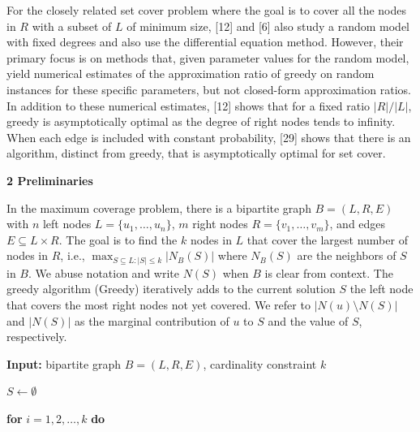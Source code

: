 For the closely related set cover problem where the goal is to cover all the nodes in $R$ with a subset of $L$ of minimum size, [12] and [6] also study a random model with fixed degrees and also use the differential equation method. However, their primary focus is on methods that, given parameter values for the random model, yield numerical estimates of the approximation ratio of greedy on random instances for these specific parameters, but not closed-form approximation ratios. In addition to these numerical estimates, [12] shows that for a fixed ratio $|R|/|L|$, greedy is asymptotically optimal as the degree of right nodes tends to infinity. When each edge is included with constant probability, [29] shows that there is an algorithm, distinct from greedy, that is asymptotically optimal for set cover.\par






\par\medskip\noindent\textbf{2 Preliminaries}\par




In the maximum coverage problem, there is a bipartite graph $B=(L,R,E)$ with $n$ left nodes $L=\{u_{1},\ldots,u_{n}\}$, $m$ right nodes $R=\{v_{1},\ldots,v_{m}\}$, and edges $E\subseteq L\times R$. The goal is to find the $k$ nodes in $L$ that cover the largest number of nodes in $R$, i.e., $\max_{S\subseteq L:|S|\leq k}|N_{B}(S)|$ where $N_{B}(S)$ are the neighbors of $S$ in $B$. We abuse notation and write $N(S)$ when $B$ is clear from context. The greedy algorithm (Greedy) iteratively adds to the current solution $S$ the left node that covers the most right nodes not yet covered. We refer to $|N(u)\setminus N(S)|$ and $|N(S)|$ as the marginal contribution of $u$ to $S$ and the value of $S$, respectively.\par





            
            
          \textbf{Input:} bipartite graph $B=(L,R,E)$, cardinality constraint $k$



            
            
          $S\leftarrow\emptyset$



            
            
          \textbf{for} $i=1,2,\dots,k$ \textbf{do}



